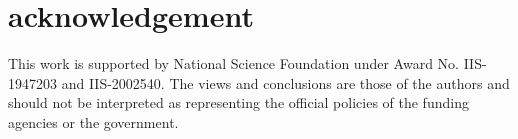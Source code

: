 \section{acknowledgement}
\label{sec:acknowledge}

This work is supported by National Science Foundation under Award No. IIS-1947203 and IIS-2002540. The views and conclusions are those of the authors and should not be interpreted as representing the official policies of the funding agencies or the government.